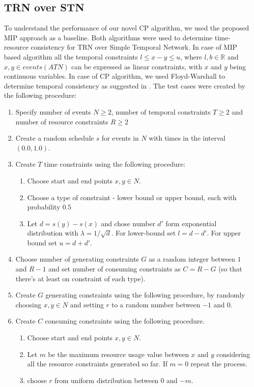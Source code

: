 \subsection{TRN over STN}
To understand the performance of our novel CP algorithm, we used the proposed MIP approach as a baseline. Both algorithms were used to determine time-resource consistency for TRN over Simple Temporal Network. In case of MIP based algorithm all the temporal constraints $l \leq x - y \leq u$, where $l,b \in \mathbb{R}$ and $x,y \in events(ATN)$ can be expressed as linear constraints, with $x$ and $y$ being continuous variables. In case of CP algorithm, we used Floyd-Warshall to determine temporal consistency as suggested in \cite{dechter1991temporal}. The test cases were created by the following procedure:
\begin{enumerate}
\item Specify number of events $N \geq 2$, number of temporal constraints $T\geq 2$ and number of resource constraints $R\geq 2$
\item Create a random schedule $s$ for events in $N$ with times in the interval $(0.0, 1.0)$.
\item Create $T$ time constraints using the following procedure:
  \begin{enumerate}
  \item Choose start and end points $x,y \in N$.
  \item Choose a type of constraint - lower bound or upper bound, each with probability $0.5$
  \item Let $d=s(y) - s(x)$ and chose number $d'$ form exponential distribution with $\lambda = 1 / \sqrt{d}$. For lower-bound set $l = d - d'$. For upper bound set $u = d + d'$.
  \end{enumerate}
\item Choose number of generating constraints $G$ as a random integer between $1$ and $R-1$ and set number of consuming constraints as $C = R - G$ (so that there's at least on constraint of each type).
\item Create $G$ generating constraints using the following procedure, by randomly choosing $x,y \in N$ and setting $r$ to a random number between $-1$ and $0$.
\item Create $C$ consuming constraints using the following procedure.
  \begin{enumerate}
  \item Choose start and end points $x,y \in N$.
  \item Let $m$ be the maximum resource usage value between $x$ and $y$ considering all the resource constraints generated so far. If $m = 0$ repeat the process.
  \item choose $r$ from uniform distribution between $0$ and $-m$.
  \end{enumerate}
\end{enumerate}

